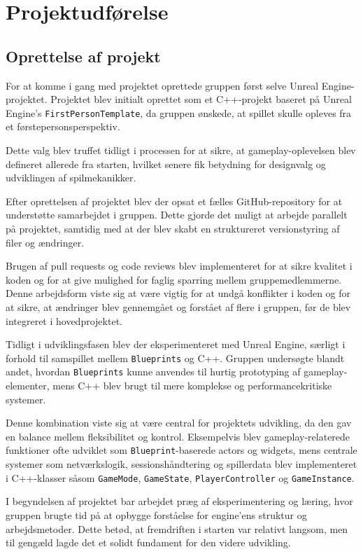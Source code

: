 \section{Projektudførelse}
\subsection{Oprettelse af projekt}
For at komme i gang med projektet oprettede gruppen først selve Unreal Engine-projektet. Projektet blev initialt oprettet som et C++-projekt baseret på Unreal Engine’s \texttt{FirstPersonTemplate}, da gruppen ønskede, at spillet skulle opleves fra et førstepersonsperspektiv.

Dette valg blev truffet tidligt i processen for at sikre, at gameplay-oplevelsen blev defineret allerede fra starten, hvilket senere fik betydning for designvalg og udviklingen af spilmekanikker.

Efter oprettelsen af projektet blev der opsat et fælles GitHub-repository for at understøtte samarbejdet i gruppen. Dette gjorde det muligt at arbejde parallelt på projektet, samtidig med at der blev skabt en struktureret versionstyring af filer og ændringer.

Brugen af pull requests og code reviews blev implementeret for at sikre kvalitet i koden og for at give mulighed for faglig sparring mellem gruppemedlemmerne. Denne arbejdsform viste sig at være vigtig for at undgå konflikter i koden og for at sikre, at ændringer blev gennemgået og forstået af flere i gruppen, før de blev integreret i hovedprojektet.

Tidligt i udviklingsfasen blev der eksperimenteret med Unreal Engine, særligt i forhold til samspillet mellem \texttt{Blueprints} og C++. Gruppen undersøgte blandt andet, hvordan \texttt{Blueprints} kunne anvendes til hurtig prototyping af gameplay-elementer, mens C++ blev brugt til mere komplekse og performancekritiske systemer.

Denne kombination viste sig at være central for projektets udvikling, da den gav en balance mellem fleksibilitet og kontrol. Eksempelvis blev gameplay-relaterede funktioner ofte udviklet som \texttt{Blueprint}-baserede actors og widgets, mens centrale systemer som netværkslogik, sessionshåndtering og spillerdata blev implementeret i C++-klasser såsom \texttt{GameMode}, \texttt{GameState}, \texttt{PlayerController} og \texttt{GameInstance}.

I begyndelsen af projektet bar arbejdet præg af eksperimentering og læring, hvor gruppen brugte tid på at opbygge forståelse for engine’ens struktur og arbejdsmetoder. Dette betød, at fremdriften i starten var relativt langsom, men til gengæld lagde det et solidt fundament for den videre udvikling.

